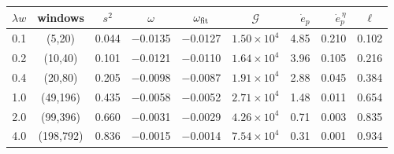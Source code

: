 \begin{ruledtabular}
\begin{tabular}{rcccccrrc}
$\lambda w$ & windows & $s^2$ & $\omega$ & $\omega_{\rm fit}$ & $\mathcal G$ & $\dot e_p$ & $\dot e_p^{\,\eta}$ & $\ell$\\
\hline
0.1 & (5,20) & 0.044 & $-$0.0135 & $-$0.0127 & $1.50\times10^{4}$ & 4.85 & 0.210 & 0.102\\
0.2 & (10,40) & 0.101 & $-$0.0121 & $-$0.0110 & $1.64\times10^{4}$ & 3.96 & 0.105 & 0.216\\
0.4 & (20,80) & 0.205 & $-$0.0098 & $-$0.0087 & $1.91\times10^{4}$ & 2.88 & 0.045 & 0.384\\
1.0 & (49,196) & 0.435 & $-$0.0058 & $-$0.0052 & $2.71\times10^{4}$ & 1.48 & 0.011 & 0.654\\
2.0 & (99,396) & 0.660 & $-$0.0031 & $-$0.0029 & $4.26\times10^{4}$ & 0.71 & 0.003 & 0.835\\
4.0 & (198,792) & 0.836 & $-$0.0015 & $-$0.0014 & $7.54\times10^{4}$ & 0.31 & 0.001 & 0.934\\
\end{tabular}
\end{ruledtabular}
